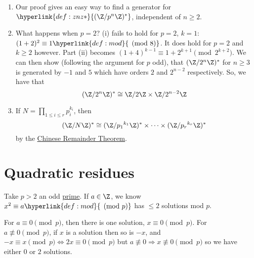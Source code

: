 \documentclass{article}
\begin{document}
\begin{remark}
    \leavevmode
    \begin{enumerate}
        \item Our proof gives an easy way to find a generator for $\hyperlink{def:znz*}{(\Z / p^n \Z)^*}$, independent of $n \geq 2$.
        \item What happens when $p=2$?
            (i) fails to hold for $p=2$, $k=1$: $(1+2)^2 \equiv 1 \hyperlink{def:mod}{\pmod{8}}$.
            It does hold for $p=2$ and $k \geq 2$ however. Part (ii) becomes $(1+4)^{k-1} \equiv 1 + 2^{k+1} \pmod{2^{k+2}}$.
            We can then show (following the argument for $p$ odd), that $(\Z/2^n \Z)^*$ for $n \geq 3$ is generated by $-1$ and $5$ which have orders $2$ and $2^{n-2}$ respectively.
            So, we have that
            \begin{equation*}
                (\Z/2^n \Z)^* \cong \Z/2\Z \times \Z/2^{n-2} \Z
            \end{equation*}
        \item If $N = \prod_{1 \leq i \leq r} p_i^{k_i}$, then
            \begin{equation*}
                (\Z/N \Z)^* \cong (\Z/{p_1}^{k_1} \Z)^* \times \dotsm \times (\Z/{p_r}^{k_r} \Z)^*
            \end{equation*}
            by the \hyperlink{thm:crt}{Chinese Remainder Theorem}.
    \end{enumerate}
\end{remark}

\clearpage

\section{Quadratic residues}
Take $p > 2$ an odd \hyperlink{def:prime}{prime}. If $a \in \Z$, we know $x^2 \equiv a \hyperlink{def:mod}{\pmod{p}}$ has $\leq 2$ solutions mod $p$.

For $a \equiv 0 \pmod{p}$, then there is one solution, $x \equiv 0 \pmod{p}$.
For $a \not \equiv 0 \pmod{p}$, if $x$ is a solution then so is $-x$, and $-x \equiv x \pmod{p} \Leftrightarrow 2x \equiv 0 \pmod{p}$ but $a \not\equiv 0 \Rightarrow x \not\equiv 0 \pmod{p}$ so we have either $0$ or $2$ solutions.

\end{document}
